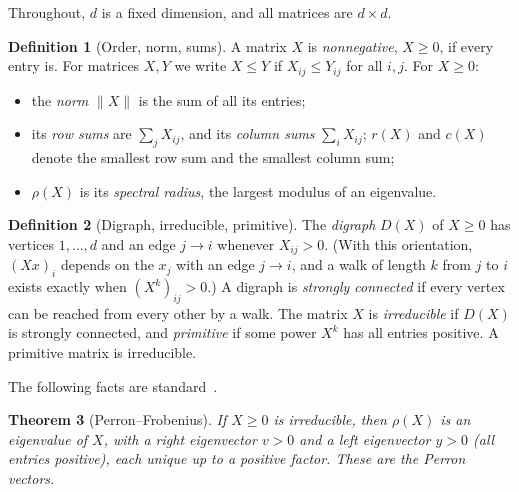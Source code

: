 \documentclass[11pt]{amsart}
\newcommand{\nrm}[1]{\lVert #1\rVert}
\newcommand{\D}{D}
\theoremstyle{plain}
\newtheorem{Theorem}{Theorem}[section]
\theoremstyle{definition}
\newtheorem{Definition}[Theorem]{Definition}
\begin{document}
Throughout, $d$ is a fixed dimension, and all matrices are $d\times d$.

\begin{Definition}[Order, norm, sums]
  \label{def:basic}
  A matrix $X$ is \emph{nonnegative}, $X\ge0$, if every entry is.  For
  matrices $X,Y$ we write $X\le Y$ if $X_{ij}\le Y_{ij}$ for all $i,j$.  For
  $X\ge0$:
  \begin{itemize}
  \item the \emph{norm} $\nrm{X}$ is the sum of all its entries;
  \item its \emph{row sums} are $\sum_jX_{ij}$, and its \emph{column sums}
    $\sum_iX_{ij}$; $r(X)$ and $c(X)$ denote the smallest row sum and the
    smallest column sum;
  \item $\rho(X)$ is its \emph{spectral radius}, the largest modulus of an
    eigenvalue.
  \end{itemize}
\end{Definition}

\begin{Definition}[Digraph, irreducible, primitive]
  \label{def:graph}
  The \emph{digraph} $\D(X)$ of $X\ge0$ has vertices $1,\dots,d$ and an
  edge $j\to i$ whenever $X_{ij}>0$.  (With this orientation, $(Xx)_i$
  depends on the $x_j$ with an edge $j\to i$, and a walk of length $k$ from
  $j$ to $i$ exists exactly when $(X^k)_{ij}>0$.)  A digraph is
  \emph{strongly connected} if every vertex can be reached from every
  other by a walk.  The matrix $X$ is \emph{irreducible} if $\D(X)$ is
  strongly connected, and \emph{primitive} if some power $X^k$ has all
  entries positive.  A primitive matrix is irreducible.
\end{Definition}

The following facts are standard~\cite{Seneta}.

\begin{Theorem}[Perron--Frobenius]
  \label{thm:pf}
  If $X\ge0$ is irreducible, then $\rho(X)$ is an eigenvalue of $X$, with
  a right eigenvector $v>0$ and a left eigenvector $y>0$ (all entries
  positive), each unique up to a positive factor.  These are the
  \emph{Perron vectors}.
\end{Theorem}
\end{document}
